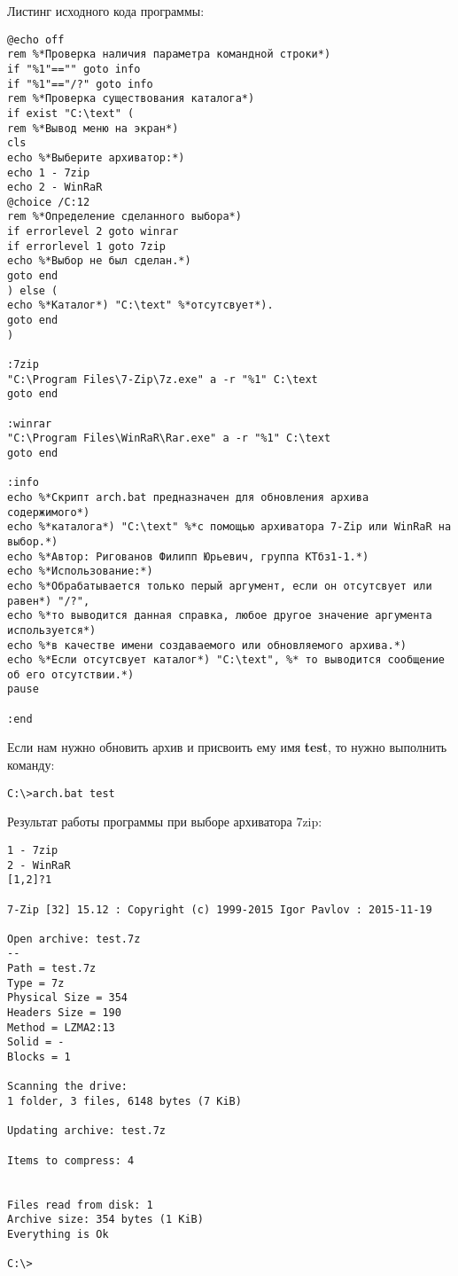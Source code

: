 \documentclass{article}
\begin{document}
Листинг исходного кода программы:
\begin{lstlisting}
@echo off
rem %*Проверка наличия параметра командной строки*)
if "%1"=="" goto info
if "%1"=="/?" goto info
rem %*Проверка существования каталога*)
if exist "C:\text" (
rem %*Вывод меню на экран*)
cls
echo %*Выберите архиватор:*)
echo 1 - 7zip
echo 2 - WinRaR
@choice /C:12
rem %*Определение сделанного выбора*)
if errorlevel 2 goto winrar
if errorlevel 1 goto 7zip
echo %*Выбор не был сделан.*)
goto end
) else (
echo %*Каталог*) "C:\text" %*отсутсвует*).
goto end
)

:7zip
"C:\Program Files\7-Zip\7z.exe" a -r "%1" C:\text
goto end

:winrar
"C:\Program Files\WinRaR\Rar.exe" a -r "%1" C:\text
goto end

:info
echo %*Скрипт arch.bat предназначен для обновления архива содержимого*)
echo %*каталога*) "C:\text" %*с помощью архиватора 7-Zip или WinRaR на выбор.*)
echo %*Автор: Ригованов Филипп Юрьевич, группа КТбз1-1.*)
echo %*Использование:*)
echo %*Обрабатывается только перый аргумент, если он отсутсвует или равен*) "/?",
echo %*то выводится данная справка, любое другое значение аргумента используется*)
echo %*в качестве имени создаваемого или обновляемого архива.*)
echo %*Если отсутсвует каталог*) "C:\text", %* то выводится сообщение об его отсутствии.*)
pause

:end
\end{lstlisting}
Если нам нужно обновить архив и присвоить ему имя \textbf{test}, то нужно выполнить команду:
\begin{lstlisting}[language={},numbers={}]
C:\>arch.bat test
\end{lstlisting}
\vfill
Результат работы программы при выборе архиватора 7zip:
\begin{lstlisting}[language={},numbers={}]
%*Выберите архиватор:*)
1 - 7zip
2 - WinRaR
[1,2]?1

7-Zip [32] 15.12 : Copyright (c) 1999-2015 Igor Pavlov : 2015-11-19

Open archive: test.7z
--
Path = test.7z
Type = 7z
Physical Size = 354
Headers Size = 190
Method = LZMA2:13
Solid = -
Blocks = 1

Scanning the drive:
1 folder, 3 files, 6148 bytes (7 KiB)

Updating archive: test.7z

Items to compress: 4


Files read from disk: 1
Archive size: 354 bytes (1 KiB)
Everything is Ok

C:\>
\end{lstlisting}
\end{document}
